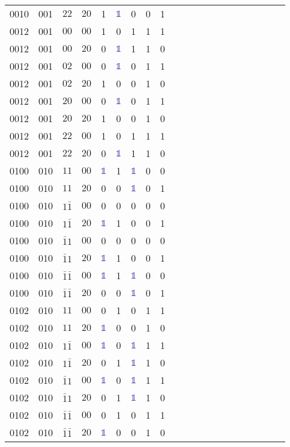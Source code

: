 \begin{longtable*}{c| cccccccccccccccccccc }
0010& 001& $22$& $20$& 1& \textcolor{blue}{$\mathds{1}$}& 0& 0& 1\\
0012& 001& $00$& $00$& 1& 0& 1& 1& 1\\
0012& 001& $00$& $20$& 0& \textcolor{blue}{$\mathds{1}$}& 1& 1& 0\\
0012& 001& $02$& $00$& 0& \textcolor{blue}{$\mathds{1}$}& 0& 1& 1\\
0012& 001& $02$& $20$& 1& 0& 0& 1& 0\\
0012& 001& $20$& $00$& 0& \textcolor{blue}{$\mathds{1}$}& 0& 1& 1\\
0012& 001& $20$& $20$& 1& 0& 0& 1& 0\\
0012& 001& $22$& $00$& 1& 0& 1& 1& 1\\
0012& 001& $22$& $20$& 0& \textcolor{blue}{$\mathds{1}$}& 1& 1& 0\\
0100& 010& $11$& $00$& \textcolor{blue}{$\mathds{1}$}& 1& \textcolor{blue}{$\mathds{1}$}& 0& 0\\
0100& 010& $11$& $20$& 0& 0& \textcolor{blue}{$\mathds{1}$}& 0& 1\\
0100& 010& $1\bar{1}$& $00$& 0& 0& 0& 0& 0\\
0100& 010& $1\bar{1}$& $20$& \textcolor{blue}{$\mathds{1}$}& 1& 0& 0& 1\\
0100& 010& $\bar{1}1$& $00$& 0& 0& 0& 0& 0\\
0100& 010& $\bar{1}1$& $20$& \textcolor{blue}{$\mathds{1}$}& 1& 0& 0& 1\\
0100& 010& $\bar{1}\bar{1}$& $00$& \textcolor{blue}{$\mathds{1}$}& 1& \textcolor{blue}{$\mathds{1}$}& 0& 0\\
0100& 010& $\bar{1}\bar{1}$& $20$& 0& 0& \textcolor{blue}{$\mathds{1}$}& 0& 1\\
0102& 010& $11$& $00$& 0& 1& 0& 1& 1\\
0102& 010& $11$& $20$& \textcolor{blue}{$\mathds{1}$}& 0& 0& 1& 0\\
0102& 010& $1\bar{1}$& $00$& \textcolor{blue}{$\mathds{1}$}& 0& \textcolor{blue}{$\mathds{1}$}& 1& 1\\
0102& 010& $1\bar{1}$& $20$& 0& 1& \textcolor{blue}{$\mathds{1}$}& 1& 0\\
0102& 010& $\bar{1}1$& $00$& \textcolor{blue}{$\mathds{1}$}& 0& \textcolor{blue}{$\mathds{1}$}& 1& 1\\
0102& 010& $\bar{1}1$& $20$& 0& 1& \textcolor{blue}{$\mathds{1}$}& 1& 0\\
0102& 010& $\bar{1}\bar{1}$& $00$& 0& 1& 0& 1& 1\\
0102& 010& $\bar{1}\bar{1}$& $20$& \textcolor{blue}{$\mathds{1}$}& 0& 0& 1& 0\\

\end{longtable*}
